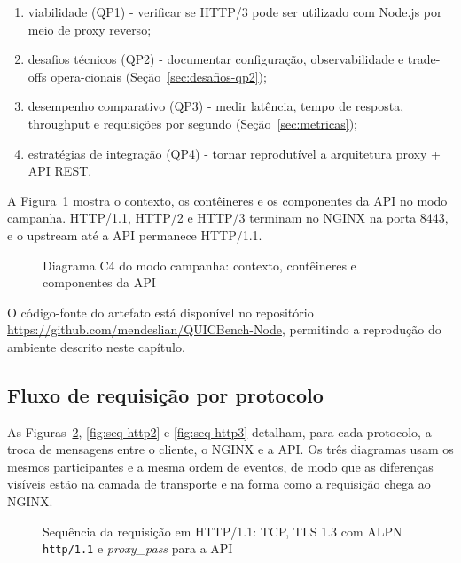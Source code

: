 \begin{enumerate}[label=\alph*)]
\item viabilidade (QP1) - verificar se HTTP/3 pode ser utilizado com Node.js por meio de proxy reverso;
\item desafios técnicos (QP2) - documentar configuração, observabilidade e trade-offs opera-cionais (Seção~\ref{sec:desafios-qp2});
\item desempenho comparativo (QP3) - medir latência, tempo de resposta, throughput e requisições por segundo (Seção~\ref{sec:metricas});
\item estratégias de integração (QP4) - tornar reprodutível a arquitetura proxy + API REST.
\end{enumerate}

A Figura~\ref{fig:arquitetura-experimental} mostra o contexto, os contêineres e os componentes da API no modo campanha. HTTP/1.1, HTTP/2 e HTTP/3 terminam no NGINX na porta 8443, e o upstream até a API permanece HTTP/1.1.

\begin{figure}[htbp]
\centering

\caption{Diagrama C4 do modo campanha: contexto, contêineres e componentes da API}\label{fig:arquitetura-experimental}
\end{figure}

O código-fonte do artefato está disponível no repositório \url{https://github.com/mendeslian/QUICBench-Node}, permitindo a reprodução do ambiente descrito neste capítulo.

\subsection{Fluxo de requisição por protocolo}\label{sec:fluxo-requisicao}

As Figuras~\ref{fig:seq-http11}, \ref{fig:seq-http2} e \ref{fig:seq-http3} detalham, para cada protocolo, a troca de mensagens entre o cliente, o NGINX e a API. Os três diagramas usam os mesmos participantes e a mesma ordem de eventos, de modo que as diferenças visíveis estão na camada de transporte e na forma como a requisição chega ao NGINX.

\begin{figure}[H]
\centering

\caption{Sequência da requisição em HTTP/1.1: TCP, TLS 1.3 com ALPN \texttt{http/1.1} e \textit{proxy\_pass} para a API}\label{fig:seq-http11}
\end{figure}

